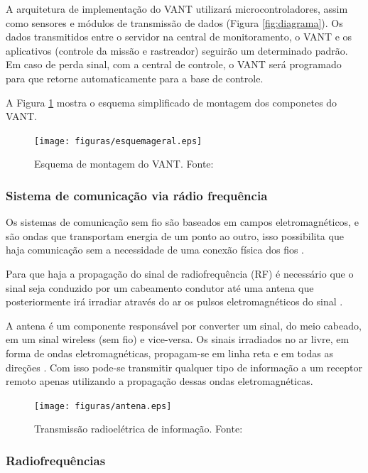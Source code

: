 A arquitetura de implementação do VANT utilizará microcontroladores, assim como sensores e módulos de transmissão de dados (Figura \ref{fig:diagrama}).
Os dados transmitidos entre o servidor na central de monitoramento, o VANT e os aplicativos (controle da missão e rastreador) seguirão um determinado padrão. Em caso de perda sinal, com a central de controle, o VANT será programado para que retorne automaticamente para a base de controle.

A Figura \ref{fig:esquemageral} mostra o esquema simplificado de montagem dos componetes do VANT.

\begin{figure}[H]
	\centering
	  \texttt{[image: figuras/esquemageral.eps]}
	\caption{Esquema de montagem do VANT. Fonte:\cite{esquematico}}
	\label{fig:esquemageral}
\end{figure}

\pagebreak

\subsubsection{Sistema de comunicação via rádio frequência}

Os sistemas de comunicação sem fio são baseados em campos eletromagnéticos, e são ondas que transportam energia de um ponto ao outro, isso possibilita que haja comunicação sem a necessidade de uma conexão física dos fios \cite{VALLE1}. 

Para que haja a propagação do sinal de radiofrequência (RF) é necessário que o sinal seja conduzido por um cabeamento condutor até uma antena que posteriormente irá irradiar através do ar os pulsos eletromagnéticos do sinal \cite{VALLE1}. 

A antena é um componente responsável por converter um sinal, do meio cabeado, em um sinal wireless (sem fio) e vice-versa. Os sinais irradiados no ar livre, em forma de ondas eletromagnéticas, propagam-se em linha reta e em todas as direções \cite{Rappaport2}. Com isso pode-se transmitir qualquer tipo de informação a um receptor remoto apenas utilizando a propagação dessas ondas eletromagnéticas.

\begin{figure}[H]
	\centering
	  \texttt{[image: figuras/antena.eps]}
	\caption{Transmissão radioelétrica de informação. Fonte: \cite{antena}}
	\label{fig:antena}
\end{figure}

\subsubsection{Radiofrequências}

